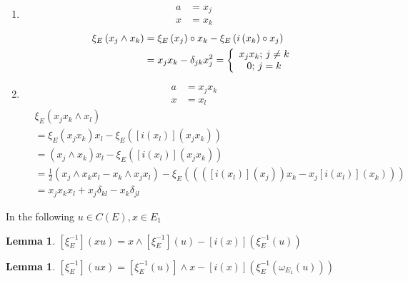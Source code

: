 \documentclass[aps,preprint]{revtex4}%
\newtheorem{lemma}[theorem]{Lemma}
\begin{document}
\begin{enumerate}
\item
\begin{align}
a  &  =x_{j}\\
x  &  =x_{k}%
\end{align}%
\begin{align}
\xi_{E}\left(  x_{j}\wedge x_{k}\right)   &  =\xi_{E}\left(  x_{j}\right)
\circ x_{k}-\xi_{E}\left(  i\left(  x_{k}\right)  \circ x_{j}\right) \\
&  =x_{j}x_{k}-\delta_{jk}x_{j}^{2}=\left\{
\begin{array}
[c]{c}%
x_{j}x_{k};\,j\neq k\\
0;\,j=k
\end{array}
\right.
\end{align}


\item
\begin{align}
a  &  =x_{j}x_{k}\\
x  &  =x_{l}%
\end{align}%
\begin{align}
&  \xi_{E}\left(  x_{j}x_{k}\wedge x_{l}\right) \\
&  =\xi_{E}\left(  x_{j}x_{k}\right)  x_{l}-\xi_{E}\left(  \left[  i\left(
x_{l}\right)  \right]  \left(  x_{j}x_{k}\right)  \right) \\
&  =\left(  x_{j}\wedge x_{k}\right)  x_{l}-\xi_{E}\left(  \left[  i\left(
x_{l}\right)  \right]  \left(  x_{j}x_{k}\right)  \right) \\
&  =\frac{1}{2}\left(  x_{j}\wedge x_{k}x_{l}-x_{k}\wedge x_{j}x_{l}\right)
-\xi_{E}\left(  \left(  \left(  \left[  i\left(  x_{l}\right)  \right]
\left(  x_{j}\right)  \right)  x_{k}-x_{j}\left[  i\left(  x_{l}\right)
\right]  \left(  x_{k}\right)  \right)  \right) \\
&  =x_{j}x_{k}x_{l}+x_{j}\delta_{kl}-x_{k}\delta_{jl}%
\end{align}

\end{enumerate}

In the following $u\in C\left(  E\right)  ,x\in E_{1}$

\begin{lemma}
$\left[  \xi_{E}^{-1}\right]  \left(  xu\right)  =x\wedge\left[  \xi_{E}%
^{-1}\right]  \left(  u\right)  -\left[  i\left(  x\right)  \right]  \left(
\xi_{E}^{-1}\left(  u\right)  \right)  $
\end{lemma}

\begin{lemma}
$\left[  \xi_{E}^{-1}\right]  \left(  ux\right)  =\left[  \xi_{E}^{-1}\left(
u\right)  \right]  \wedge x-\left[  i\left(  x\right)  \right]  \left(
\xi_{E}^{-1}\left(  \omega_{E_{1}}\left(  u\right)  \right)  \right)  $
\end{lemma}
\end{document}
